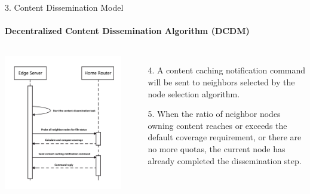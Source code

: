 \documentclass{beamer}		%
\begin{document}
\begin{frame}{3. Content Dissemination Model}
\framesubtitle{Decentralized Content Dissemination Algorithm (DCDM)}
\begin{columns}
\includegraphics[scale=0.08]{imgs/Figure1.png}
\begin{enumerate}
    \item[4.] A content caching notification command will be sent to neighbors selected by the node selection algorithm.
    \item[5.] When the ratio of neighbor nodes owning content reaches or exceeds the default coverage requirement, or there are no more quotas, the current node has already completed the dissemination step.
\end{enumerate}
\end{columns}
\end{frame}
\end{document}
